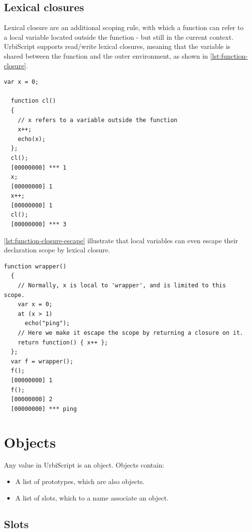 \documentclass[openright,twoside,12pt]{report}
\newcommand{\us}{UrbiScript\xspace}
\newcommand   {\floatpos}          {htbp}
\newcommand{\lst}[1]{\autoref{lst:#1}}
\begin{document}
\subsection{Lexical closures}
\label{sect:us-fun-closures}

Lexical closure are an additional scoping rule, with which a function
can refer to a local variable located outside the function - but still
in the current context. \us supports read/write lexical closures,
meaning that the variable is shared between the function and the outer
environment, as shown in \lst{function-closure}.

\begin{lstlisting}[caption=Lexical
  closure,label=lst:function-closure,float=\floatpos]
  var x = 0;

  function cl()
  {
    // x refers to a variable outside the function
    x++;
    echo(x);
  };
  cl();
  [00000000] *** 1
  x;
  [00000000] 1
  x++;
  [00000000] 1
  cl();
  [00000000] *** 3
\end{lstlisting}

\lst{function-closure-escape} illustrate that local variables can even
escape their declaration scope by lexical closure.

\begin{lstlisting}[caption=Local variable escaping its scope by
  lexical closure.,label=lst:function-closure-escape,float=\floatpos]
  function wrapper()
  {
    // Normally, x is local to 'wrapper', and is limited to this scope.
    var x = 0;
    at (x > 1)
      echo("ping");
    // Here we make it escape the scope by returning a closure on it.
    return function() { x++ };
  };
  var f = wrapper();
  f();
  [00000000] 1
  f();
  [00000000] 2
  [00000000] *** ping
\end{lstlisting}

\FloatBarrier
\section{Objects}

Any value in \us is an object. Objects contain:

\begin{itemize}
\item A list of prototypes, which are also objects.
\item A list of slots, which to a name associate an object.
\end{itemize}

\subsection{Slots}
\end{document}
